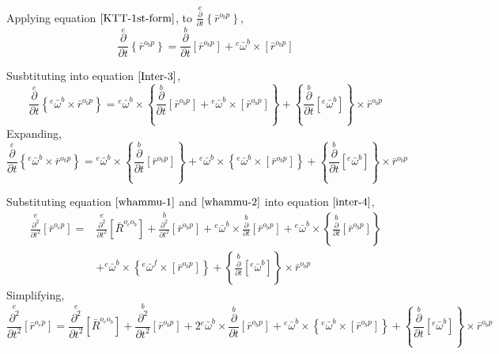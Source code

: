 Applying equation $\ref{KTT-1st-form}$, to $\displaystyle \overset{e}{\frac{\partial}{\partial t}}\left\{\bar{r}^{o_{b}p}\right\}$,
$$\overset{e}{\frac{\partial}{\partial t}}\left\{\bar{r}^{o_{b}p}\right\} = \overset{b}{\frac{\partial}{\partial t}}\left[\bar{r}^{o_{b}p}\right] + {}^{e}\bar{\omega}^{b}\times\left[\bar{r}^{o_{b}p}\right]$$

Susbtituting into equation $\ref{Inter-3}$,
$$\overset{e}{\frac{\partial}{\partial t}}\left\{{}^{e}\bar{\omega}^{b}\times\bar{r}^{o_{b}p}\right\} = {}^{e}\bar{\omega}^{b}\times\left\{\overset{b}{\frac{\partial}{\partial t}}\left[\bar{r}^{o_{b}p}\right] + {}^{e}\bar{\omega}^{b}\times\left[\bar{r}^{o_{b}p}\right]\right\}    + \left\{\overset{b}{\frac{\partial}{\partial t}}[{}^{e}\bar{\omega}^{b}]\right\}\times\bar{r}^{o_{b}p}$$
Expanding,
\begin{equation}\overset{e}{\frac{\partial}{\partial t}}\left\{{}^{e}\bar{\omega}^{b}\times\bar{r}^{o_{b}p}\right\} = {}^{e}\bar{\omega}^{b}\times\left\{\overset{b}{\frac{\partial}{\partial t}}\left[\bar{r}^{o_{b}p}\right]\right\}   +   {}^{e}\bar{\omega}^{b}\times\left\{{}^{e}\bar{\omega}^{b}\times\left[\bar{r}^{o_{b}p}\right]\right\}    +    \left\{\overset{b}{\frac{\partial}{\partial t}}[{}^{e}\bar{\omega}^{b}]\right\}\times\bar{r}^{o_{b}p}\label{whammu-2}\end{equation}

Substituting equation $\ref{whammu-1}$ and $\ref{whammu-2}$ into equation $\ref{inter-4}$,
\begin{align*}\overset{e}{\frac{\partial^{2}}{\partial t^{2}}}[\bar{r}^{o_{e}p}]    =&    \overset{e}{\frac{\partial^{2}}{\partial t^{2}}}[\bar{R}^{o_{e}o_{b}}]     +   \overset{b}{\frac{\partial^{2}}{\partial t^{2}}}[\bar{r}^{o_{b}p}] + {}^{e}\bar{\omega}^{b}\times\overset{b}{\frac{\partial}{\partial t}}[\bar{r}^{o_{b}p}]     +   {}^{e}\bar{\omega}^{b}\times\left\{\overset{b}{\frac{\partial}{\partial t}}\left[\bar{r}^{o_{b}p}\right]\right\}   \\&+   {}^{e}\bar{\omega}^{b}\times\left\{{}^{e}\bar{\omega}^{f}\times\left[\bar{r}^{o_{b}p}\right]\right\}    +    \left\{\overset{b}{\frac{\partial}{\partial t}}[{}^{e}\bar{\omega}^{b}]\right\}\times\bar{r}^{o_{b}p}\end{align*}
Simplifying,
\begin{equation}
\overset{e}{\frac{\partial^{2}}{\partial t^{2}}}[\bar{r}^{o_{e}p}] =
\overset{e}{\frac{\partial^{2}}{\partial t^{2}}}[\bar{R}^{o_{e}o_{b}}]     
+ \overset{b}{\frac{\partial^{2}}{\partial t^{2}}}[\bar{r}^{o_{b}p}] 
+ 2{}^{e}\bar{\omega}^{b}\times\overset{b}{\frac{\partial}{\partial t}}[\bar{r}^{o_{b}p}]
+ {}^{e}\bar{\omega}^{b}\times\left\{{}^{e}\bar{\omega}^{b}\times\left[\bar{r}^{o_{b}p}\right]\right\}    
+ \left\{\overset{b}{\frac{\partial}{\partial t}}[{}^{e}\bar{\omega}^{b}]\right\}\times\bar{r}^{o_{b}p}
\label{Kinematic Transport Theorem Main Result}
\end{equation}

